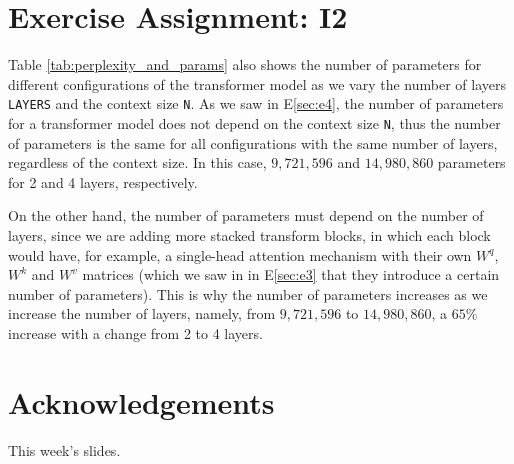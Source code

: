 \documentclass{article}
\begin{document}
\section{Exercise Assignment: I2}
Table \ref{tab:perplexity_and_params} also shows the number of parameters for different configurations of the transformer model as we vary the number of layers \texttt{LAYERS} and the context size \texttt{N}. As we saw in E\ref{sec:e4}, the number of parameters for a transformer model does not depend on the context size \texttt{N}, thus the number of parameters is the same for all configurations with the same number of layers, regardless of the context size. In this case, $9{,}721{,}596$ and $14{,}980{,}860$ parameters for 2 and 4 layers, respectively.

On the other hand, the number of parameters must depend on the number of layers, since we are adding more stacked transform blocks, in which each block would have, for example, a single-head attention mechanism with their own $W^q$, $W^k$ and $W^v$ matrices (which we saw in in E\ref{sec:e3} that they introduce a certain number of parameters). This is why the number of parameters increases as we increase the number of layers, namely, from $9{,}721{,}596$ to $14{,}980{,}860$, a $65\%$ increase with a change from 2 to 4 layers.

\clearpage

\section*{Acknowledgements}
This week's slides.

% 
% 

\end{document}
